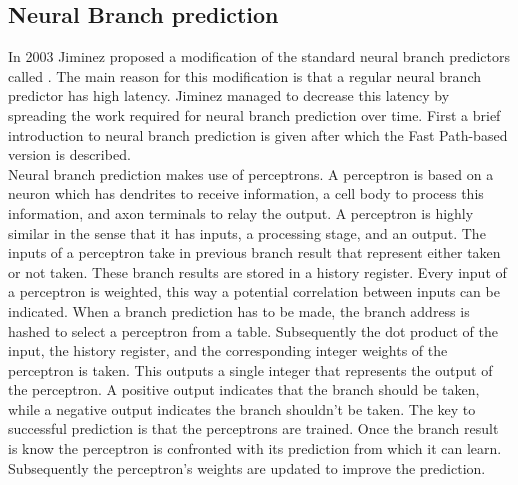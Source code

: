 \subsection{Neural Branch prediction}

In 2003 Jiminez \cite{neural} proposed a modification of the standard neural branch predictors called . The main reason for this modification is that a regular neural branch predictor has high latency. Jiminez managed to decrease this latency by spreading the work required for neural branch prediction over time. First a brief introduction to neural branch prediction is given after which the Fast Path-based version is described.\\

Neural branch prediction makes use of perceptrons. A perceptron is based on a neuron which has dendrites to receive information, a cell body to process this information, and axon terminals to relay the output. A perceptron is highly similar in the sense that it has inputs, a processing stage, and an output. The inputs of a perceptron take in previous branch result that represent either taken or not taken. These branch results are stored in a history register. Every input of a perceptron is weighted, this way a potential correlation between inputs can be indicated.  When a branch prediction has to be made, the branch address is hashed to select a perceptron from a table. Subsequently the dot product of the input, the history register, and the corresponding integer weights of the perceptron is taken. This outputs a single integer that represents the output of the perceptron. A positive output indicates that the branch should be taken, while a negative output indicates the branch shouldn't be taken. The key to successful prediction is that the perceptrons are trained. Once the branch result is know the perceptron is confronted with its prediction from which it can learn. Subsequently the perceptron's weights are updated to improve the prediction.

